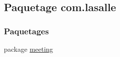 \hypertarget{namespacecom_1_1lasalle}{}\subsection{Paquetage com.\+lasalle}
\label{namespacecom_1_1lasalle}
\subsubsection*{Paquetages}
\begin{DoxyCompactItemize}
\item 
package \hyperlink{namespacecom_1_1lasalle_1_1meeting}{meeting}
\end{DoxyCompactItemize}
